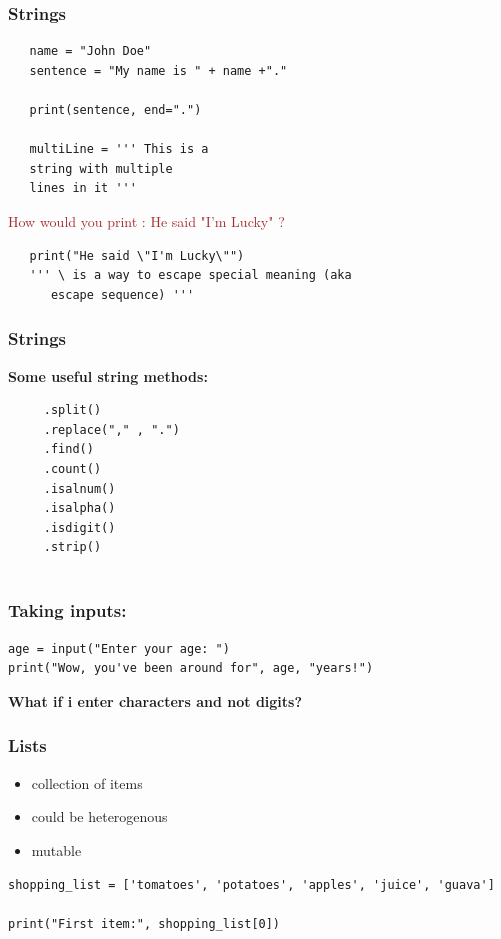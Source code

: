 \documentclass[12pt, aspectratio=169]{beamer}
\begin{document}
\begin{frame}[fragile]
  \frametitle{Strings}
\begin{verbatim}
   name = "John Doe"
   sentence = "My name is " + name +"."

   print(sentence, end=".")

   multiLine = ''' This is a
   string with multiple
   lines in it '''
\end{verbatim}
  \pause
  \textcolor{brown}{How would you print :  He said "I'm Lucky" ?} 
  \pause
  \begin{verbatim}
   print("He said \"I'm Lucky\"")  
   ''' \ is a way to escape special meaning (aka
      escape sequence) '''
\end{verbatim}
  \vspace{.5em}
\end{frame}

\begin{frame}[fragile]
  \frametitle{Strings}
\textbf{Some useful string methods: }
\begin{verbatim}
     .split()
     .replace("," , ".")
     .find()
     .count()
     .isalnum()
     .isalpha()
     .isdigit()
     .strip()
     
\end{verbatim}
\end{frame}


\begin{frame}[fragile]
  \frametitle{Taking inputs: }
\textbf{}
\begin{verbatim}
age = input("Enter your age: ")
print("Wow, you've been around for", age, "years!")
\end{verbatim}

\textbf{What if i enter characters and not digits?}

\end{frame}



\begin{frame}[fragile]
  \frametitle{Lists}
  \begin{itemize}
  \item collection of items
  \item could be heterogenous
  \item mutable
  \end{itemize}
  \vspace{2em}
\begin{verbatim}
shopping_list = ['tomatoes', 'potatoes', 'apples', 'juice', 'guava']

print("First item:", shopping_list[0])
\end{verbatim}
\end{frame}
\end{document}
